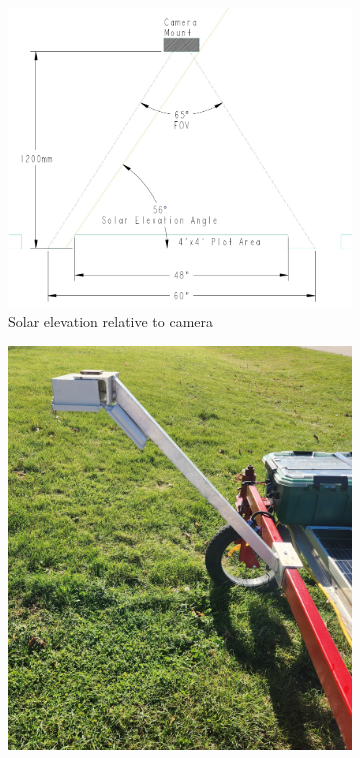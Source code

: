\begin{figure}[!ht]
  \begin{subfigure}{0.4\textwidth}
    \includegraphics[width=\textwidth]{images/Sun Angle.png}
   \caption{Solar elevation relative to camera}
    \label{fig:SolAng}
  \end{subfigure}
  \hfill
  \begin{subfigure}[b]{0.4\textwidth}
    \includegraphics[width=\textwidth]{images/Camera Mounting.jpg}

\end{subfigure}
\end{figure}
